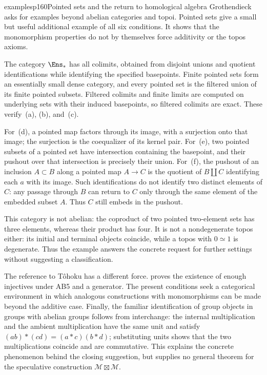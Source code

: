 \begin{dcomment}{examples}{p160}{Pointed sets and the return to homological algebra}
Grothendieck asks for examples beyond abelian categories and topoi. Pointed sets give a small but useful additional example of all six conditions. It shows that the monomorphism properties do not by themselves force additivity or the topos axioms.

The category $\Ens_*$ has all colimits, obtained from disjoint unions and quotient identifications while identifying the specified basepoints. Finite pointed sets form an essentially small dense category, and every pointed set is the filtered union of its finite pointed subsets. Filtered colimits and finite limits are computed on underlying sets with their induced basepoints, so filtered colimits are exact. These verify~(a), (b), and~(c).

For~(d), a pointed map factors through its image, with a surjection onto that image; the surjection is the coequalizer of its kernel pair. For~(e), two pointed subsets of a pointed set have intersection containing the basepoint, and their pushout over that intersection is precisely their union. For~(f), the pushout of an inclusion $A\subset B$ along a pointed map $A\to C$ is the quotient of $B\amalg C$ identifying each $a$ with its image. Such identifications do not identify two distinct elements of $C$: any passage through $B$ can return to $C$ only through the same element of the embedded subset $A$. Thus $C$ still embeds in the pushout.

This category is not abelian: the coproduct of two pointed two-element sets has three elements, whereas their product has four. It is not a nondegenerate topos either: its initial and terminal objects coincide, while a topos with $0\simeq1$ is degenerate. Thus the example answers the concrete request for further settings without suggesting a classification.

The reference to T\^ohoku has a different force. \citet[Theorem~1.10.1]{Grothendieck1957Tohoku} proves the existence of enough injectives under AB5 and a generator. The present conditions seek a categorical environment in which analogous constructions with monomorphisms can be made beyond the additive case. Finally, the familiar identification of group objects in groups with abelian groups follows from interchange: the internal multiplication and the ambient multiplication have the same unit and satisfy
$(ab)*(cd)=(a*c)(b*d)$; substituting units shows that the two multiplications coincide and are commutative. This explains the concrete phenomenon behind the closing suggestion, but supplies no general theorem for the speculative construction $\mathcal M\boxtimes\mathcal M$.
\end{dcomment}

